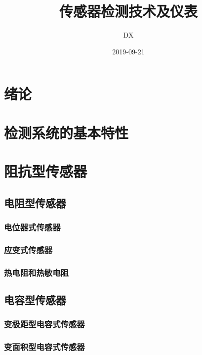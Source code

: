 \documentclass[11pt]{book}
\begin{document}
\title{传感器检测技术及仪表}
\author{DX}
\date{2019-09-21}
\maketitle
\tableofcontents
\chapter{绪论}

\chapter{检测系统的基本特性}

\chapter{阻抗型传感器}
\section{电阻型传感器}
\subsection{电位器式传感器}%
\label{sub:dian_wei_qi_shi_chuan_gan_qi_}

\subsection{应变式传感器}%
\label{sub:ying_bian_shi_chuan_gan_qi_}

\subsection{热电阻和热敏电阻}%
\label{sub:re_dian_zu_he_re_min_dian_zu_}

\section{电容型传感器}
\subsection{变极距型电容式传感器}%
\label{sub:bian_ji_ju_xing_dian_rong_shi_chuan_gan_qi_}

\subsection{变面积型电容式传感器}%
\label{sub:bian_mian_ji_xing_dian_rong_shi_chuan_gan_qi_}
\end{document}
